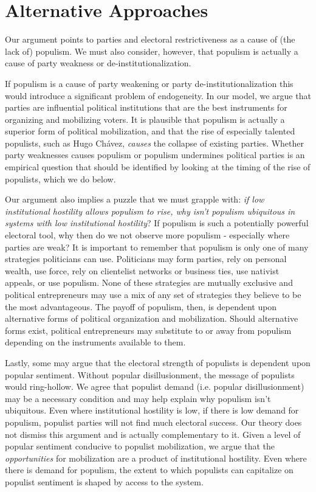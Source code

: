 \documentclass[a4paper,12pt]{article}\usepackage[]{graphicx}\usepackage[]{color}
\begin{document}
\section*{Alternative Approaches}
Our argument points to parties and electoral restrictiveness as a cause of (the lack of) populism. We must also consider, however, that populism is actually a cause of party weakness or de-institutionalization. 
\par
If populism is a cause of party weakening or party de-institutionalization this would introduce a significant problem of endogeneity. In our model, we argue that parties are influential political institutions that are the best instruments for organizing and mobilizing voters. It is plausible that populism is actually a superior form of political mobilization, and that the rise of especially talented populists, such as Hugo Ch\'{a}vez, \textit{causes} the collapse of existing parties. Whether party weaknesses causes populism or populism undermines political parties is an empirical question that should be identified by looking at the timing of the rise of populists, which we do below. 
\par
Our argument also implies a puzzle that we must grapple with: \textit{if low institutional hostility allows populism to rise, why isn't populism ubiquitous in systems with low institutional hostility}? If populism is such a potentially powerful electoral tool, why then do we not observe more populism - especially where parties are weak? It is important to remember that populism is only one of many strategies politicians can use. Politicians may form parties, rely on personal wealth, use force, rely on clientelist networks or business ties, use nativist appeals, or use populism. None of these strategies are mutually exclusive and political entrepreneurs may use a mix of any set of strategies they believe to be the most advantageous. The payoff of populism, then, is dependent upon alternative forms of political organization and mobilization. Should alternative forms exist, political entrepreneurs may substitute to or away from populism depending on the instruments available to them. 
\par
Lastly, some may argue that the electoral strength of populists is dependent upon popular sentiment. Without popular disillusionment, the message of populists would ring-hollow. We agree that populist demand (i.e. popular disillusionment) may be a necessary condition and may help explain why populism isn't ubiquitous. Even where institutional hostility is low, if there is low demand for populism, populist parties will not find much electoral success. Our theory does not dismiss this argument and is actually complementary to it. Given a level of popular sentiment conducive to populist mobilization, we argue that the \textit{opportunities} for mobilization are a product of institutional hostility. Even where there is demand for populism, the extent to which populists can capitalize on populist sentiment is shaped by access to the system.
\end{document}
